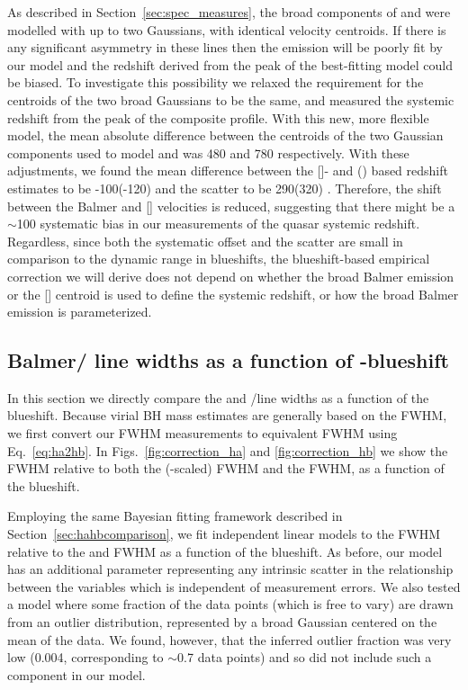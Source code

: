 As described in Section~\ref{sec:spec_measures}, the broad components of \ha and \hb were modelled with up to two Gaussians, with identical velocity centroids. 
If there is any significant asymmetry in these lines then the emission will be poorly fit by our model and the 
redshift derived from the peak of the best-fitting model could be biased. 
To investigate this possibility we relaxed the requirement for the centroids of the two broad Gaussians to be the same, and measured the systemic redshift from the peak of the composite profile. 
With this new, more flexible model, the mean absolute difference between the centroids of the two Gaussian components used to model \ha and \hb was 480 and 780 \kms respectively. 
With these adjustments, we found the mean difference between the []- and \hans(\hbns) based redshift estimates to be -100(-120) \kms and the scatter to be 290(320) \kms. 
Therefore, the shift between the Balmer and [] velocities is reduced, suggesting that there might be a $\sim$100 \kms systematic bias in our measurements of the quasar systemic redshift.  
Regardless, since both the systematic offset and the scatter are small in comparison to the dynamic range in  blueshifts, the blueshift-based empirical correction we will derive does not depend on whether the broad Balmer emission or the [] centroid is used to define the systemic redshift, or how the broad Balmer emission is parameterized. 

\subsection{Balmer/ line widths as a function of -blueshift}
\label{sec:correction}

In this section we directly compare the  and \hans/\hb line widths as a function of the  blueshift. 
Because virial BH mass estimates are generally based on the \hb FWHM, we first convert our \ha FWHM measurements to equivalent \hb FWHM using Eq.~\ref{eq:ha2hb}.  
In Figs.~\ref{fig:correction_ha} and \ref{fig:correction_hb} we show the  FWHM relative to both the (\hbns-scaled) \ha FWHM and the \hb FWHM, as a function of the  blueshift. 

Employing the same Bayesian fitting framework described in Section~\ref{sec:hahbcomparison}, we fit independent linear models to the  FWHM relative to the \ha and \hb FWHM as a function of the  blueshift. 
As before, our model has an additional parameter representing any intrinsic scatter in the relationship between the variables which is independent of measurement errors.  
We also tested a model where some fraction of the data points (which is free to vary) are drawn from an outlier distribution, represented by a broad Gaussian centered on the mean of the data. 
We found, however, that the inferred outlier fraction was very low (0.004, corresponding to $\sim$0.7 data points) and so did not include such a component in our model. 

